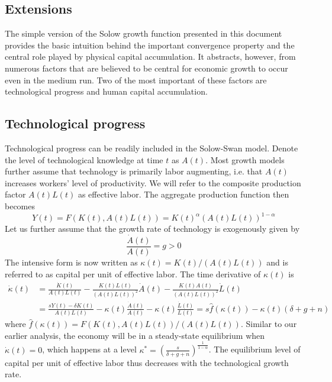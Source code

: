 \documentclass[\topdir/lecture\_notes.tex]{subfiles}
\begin{document}
\subsection{Extensions}
The simple version of the Solow growth function presented in this document provides the basic intuition behind the important convergence property and the central role played by physical capital accumulation.
It abstracts, however, from numerous factors that are believed to be central for economic growth to occur even in the medium run.
Two of the most important of these factors are technological progress and human capital accumulation.

\subsection{Technological progress}
Technological progress can be readily included in the Solow-Swan model.
Denote the level of technological knowledge at time \(t\) as \(A(t)\).
Most growth models further assume that technology is primarily labor augmenting, i.e. that \(A(t)\) increases workers' level of productivity.
We will refer to the composite production factor \(A(t) L(t)\) as effective labor.
The aggregate production function then becomes
\begin{equation}
  Y(t)=F(K(t), A(t) L(t))=K(t)^{\alpha}(A(t) L(t))^{1-\alpha}
  \label{eq:solow-production-tech}
\end{equation}
Let us further assume that the growth rate of technology is exogenously given by
\begin{equation}
  \frac{\dot{A}(t)}{A(t)}=g>0
  \label{eq:solow-tech-growth}
\end{equation}
The intensive form is now written as \(\kappa(t)=K(t) / (A(t) L(t))\) and is referred to as capital per unit of effective labor.
The time derivative of \(\kappa(t)\) is
\begin{equation}
\begin{aligned}
\dot{\kappa}(t) & =\frac{\dot{K}(t)}{A(t) L(t)}-\frac{K(t) L(t)}{(A(t) L(t))^{2}} \dot{A}(t)-\frac{K(t) A(t)}{(A(t) L(t))^{2}} \dot{L}(t) \\
& =\frac{s Y(t)-\delta K(t)}{A(t) L(t)}-\kappa(t) \frac{\dot{A}(t)}{A(t)}-\kappa(t) \frac{\dot{L}(t)}{L(t)}=s \hat{f}(\kappa(t))-\kappa(t)(\delta+g+n)
\end{aligned}
\label{eq:solow-kappa-dot}
\end{equation}
where \(\hat{f}(\kappa(t))=F(K(t), A(t) L(t)) / (A(t) L(t))\).
Similar to our earlier analysis, the economy will be in a steady-state equilibrium when \(\dot{\kappa}(t)=0\), which happens at a level \(\kappa^{*}=\left(\frac{s}{\delta+g+n}\right)^{\frac{1}{1-\alpha}}\).
The equilibrium level of capital per unit of effective labor thus decreases with the technological growth rate.
\end{document}
